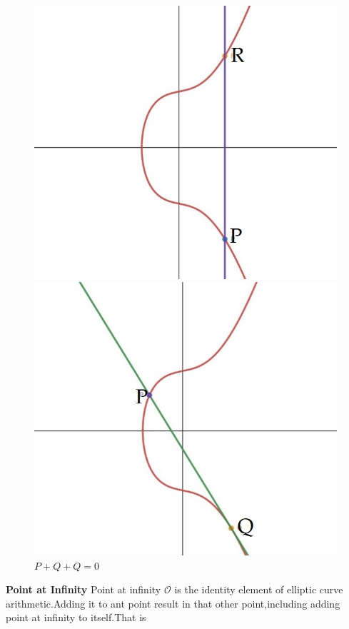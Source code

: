 \documentclass{article}
\begin{document}
\begin{figure}[hb]
  \begin{minipage}[hb]{0.31\textwidth}
    \includegraphics[width=\textwidth]{PR.jpeg}
    \caption{  \(P+R+0=0\)}
  \end{minipage}
  \hfill
  \begin{minipage}[hb]{0.31\textwidth}
    \includegraphics[width=\textwidth]{PQ.jpeg}
    \caption{  \(P+Q+Q=0\)}
  \end{minipage}
  \hfill
  
\end{figure}
\textbf{Point at Infinity}
\newline
Point at infinity \({\mathcal{O}}\) is the identity element of elliptic curve arithmetic.Adding it to ant point result in that other point,including adding point at infinity to itself.That is
\end{document}

